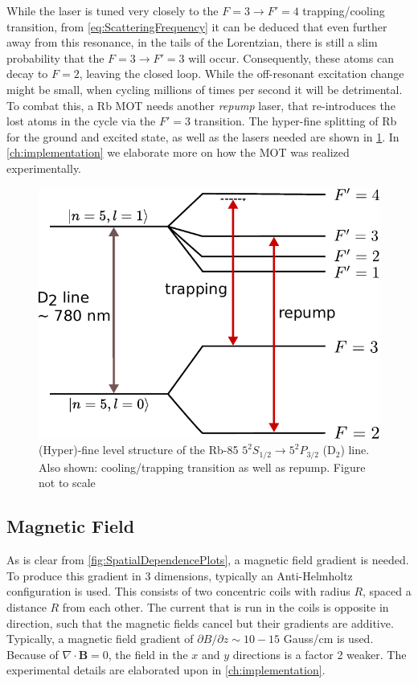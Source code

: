 While the laser is tuned very closely to the $F = 3 \rightarrow F'=4$ trapping/cooling transition, from \cref{eq:ScatteringFrequency} it can be deduced that even further away from this resonance, in the tails of the Lorentzian, there is still a slim probability that the $F=3 \rightarrow F'=3$ will occur.
Consequently, these atoms can decay to $F=2$, leaving the closed loop.
While the off-resonant excitation change might be small, when cycling millions of times per second it will be detrimental. 
To combat this, a Rb \ac{MOT} needs another \textit{repump} laser, that re-introduces the lost atoms in the cycle via the $F'=3$ transition.
The hyper-fine splitting of Rb for the ground and excited state, as well as the lasers needed are shown in \cref{fig:D2line}.
In \cref{ch:implementation} we elaborate more on how the MOT was realized experimentally. 

\begin{figure}
    \centering
    \includegraphics[width=0.54\linewidth]{figures/D2line.pdf}
    \caption{(Hyper)-fine level structure of the Rb-85 $5^{2}S_{1/2} \rightarrow 5 ^2P_{3/2}$ (D$_2$) line. Also shown: cooling/trapping transition as well as repump. Figure not to scale}
    \label{fig:D2line}
\end{figure}


\subsection{Magnetic Field}

As is clear from \cref{fig:SpatialDependencePlots}, a magnetic field gradient is needed.
To produce this gradient in 3 dimensions, typically an Anti-Helmholtz configuration is used. 
This consists of two concentric coils with radius $R$, spaced a distance $R$ from each other. 
The current that is run in the coils is opposite in direction, such that the magnetic fields cancel but their gradients are additive.
Typically, a magnetic field gradient of $\partial B/\partial z \sim 10-15$ Gauss/cm is used.
Because of $\nabla \cdot \mathbf{B}=0$, the field in the $x$ and $y$ directions is a factor 2 weaker. The experimental details are elaborated upon in \cref{ch:implementation}.

